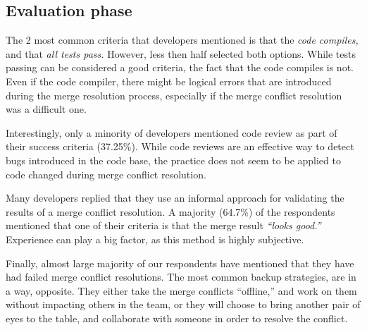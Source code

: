 
\subsection{Evaluation phase}

The 2 most common criteria that developers mentioned is that the \emph{code compiles,} and that \emph{all tests pass.}
However, less then half selected both options.
While tests passing can be considered a good criteria, the fact that the code compiles is not.
Even if the code compiler, there might be logical errors that are introduced during the merge resolution process, especially if the merge conflict resolution was a difficult one.

Interestingly, only a minority of developers mentioned code review as part of their success criteria (37.25\%).
While code reviews are an effective way to detect bugs introduced in the code base, the practice does not seem to be applied to code changed during merge conflict resolution.

Many developers replied that they use an informal approach for validating the results of a merge conflict resolution.
A majority (64.7\%) of the respondents mentioned that one of their criteria is that the merge result \emph{``looks good.''}
Experience can play a big factor, as this method is highly subjective.



Finally, almost large majority of our respondents have mentioned that they have had failed merge conflict resolutions.
The most common backup strategies, are in a way, opposite.
They either take the merge conflicts ``offline,'' and work on them without impacting others in the team, or they will choose to bring another pair of eyes to the table, and collaborate with someone in order to resolve the conflict.

